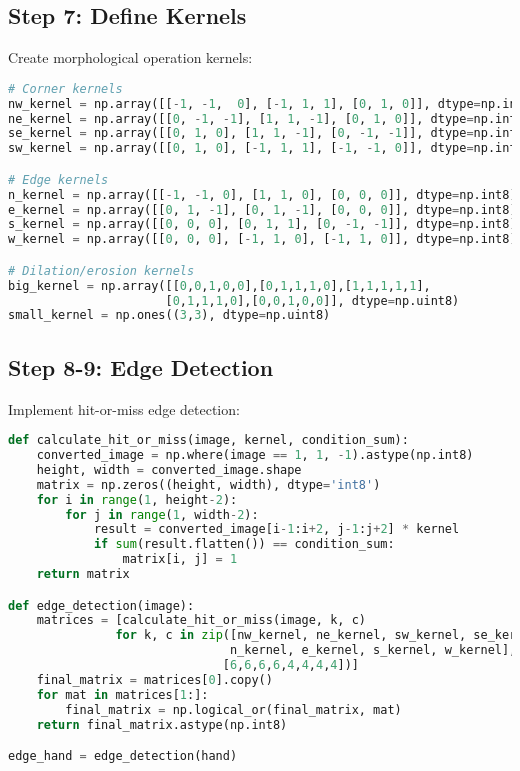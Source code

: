 \documentclass[12pt]{article}
\begin{document}
\subsection{Step 7: Define Kernels}
Create morphological operation kernels:
\begin{lstlisting}[language=Python]
# Corner kernels
nw_kernel = np.array([[-1, -1,  0], [-1, 1, 1], [0, 1, 0]], dtype=np.int8)
ne_kernel = np.array([[0, -1, -1], [1, 1, -1], [0, 1, 0]], dtype=np.int8)
se_kernel = np.array([[0, 1, 0], [1, 1, -1], [0, -1, -1]], dtype=np.int8)
sw_kernel = np.array([[0, 1, 0], [-1, 1, 1], [-1, -1, 0]], dtype=np.int8)

# Edge kernels
n_kernel = np.array([[-1, -1, 0], [1, 1, 0], [0, 0, 0]], dtype=np.int8)
e_kernel = np.array([[0, 1, -1], [0, 1, -1], [0, 0, 0]], dtype=np.int8)
s_kernel = np.array([[0, 0, 0], [0, 1, 1], [0, -1, -1]], dtype=np.int8)
w_kernel = np.array([[0, 0, 0], [-1, 1, 0], [-1, 1, 0]], dtype=np.int8)

# Dilation/erosion kernels
big_kernel = np.array([[0,0,1,0,0],[0,1,1,1,0],[1,1,1,1,1],
                      [0,1,1,1,0],[0,0,1,0,0]], dtype=np.uint8)
small_kernel = np.ones((3,3), dtype=np.uint8)
\end{lstlisting}

\subsection{Step 8-9: Edge Detection}
Implement hit-or-miss edge detection:
\begin{lstlisting}[language=Python]
def calculate_hit_or_miss(image, kernel, condition_sum):
    converted_image = np.where(image == 1, 1, -1).astype(np.int8)
    height, width = converted_image.shape
    matrix = np.zeros((height, width), dtype='int8')
    for i in range(1, height-2):
        for j in range(1, width-2):
            result = converted_image[i-1:i+2, j-1:j+2] * kernel
            if sum(result.flatten()) == condition_sum:
                matrix[i, j] = 1
    return matrix

def edge_detection(image):
    matrices = [calculate_hit_or_miss(image, k, c) 
               for k, c in zip([nw_kernel, ne_kernel, sw_kernel, se_kernel,
                               n_kernel, e_kernel, s_kernel, w_kernel],
                              [6,6,6,6,4,4,4,4])]
    final_matrix = matrices[0].copy()
    for mat in matrices[1:]:
        final_matrix = np.logical_or(final_matrix, mat)
    return final_matrix.astype(np.int8)

edge_hand = edge_detection(hand)
\end{lstlisting}
\end{document}

